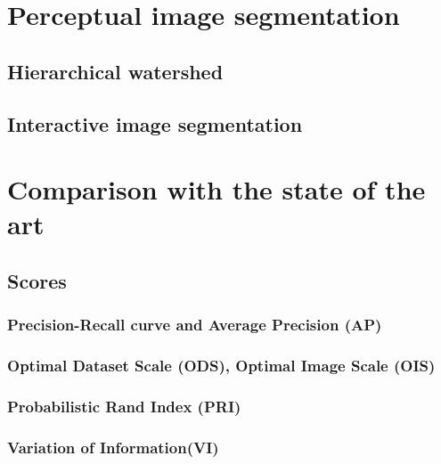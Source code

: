 \section{Perceptual image segmentation}
\subsection{Hierarchical watershed}
\subsection{Interactive image segmentation}



\section{Comparison with the state of the art}
\subsection{Scores}

\subsubsection{Precision-Recall curve and Average Precision (AP)}
\subsubsection{Optimal Dataset Scale (ODS), Optimal Image Scale (OIS)}
\subsubsection{Probabilistic Rand Index (PRI)}
\subsubsection{Variation of Information(VI)}

\subsubsection{}

